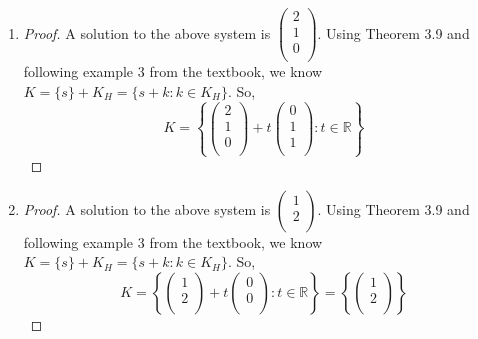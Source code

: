 \documentclass[11pt]{scrartcl}
\begin{document}
\begin{enumerate}[label=\alph*.]
{\begin{proof}
\[				t\begin{pmatrix}
					1\\
					2\\
					3\\
				\end{pmatrix}: t \in \mathbb{R}
			\right\}
			\]
		\end{proof}
	}
	\item{
		\begin{proof}
			A solution to the above system is  
			$
			\begin{pmatrix}
				2\\
				1\\
				0\\
			\end{pmatrix}
			$.	
			Using Theorem 3.9 and following example 3 from the textbook, we know $K = \{s\} + K_H = \{s + k : k \in K_H \}$.
			So, 
			\[
			K=
			\left\{
				\begin{pmatrix}
					2\\
					1\\
					0\\
				\end{pmatrix} +
				t\begin{pmatrix}
					0\\
					1\\
					1\\
				\end{pmatrix}: t \in \mathbb{R}
			\right\}
			\]
		\end{proof}
	}
	\item{
		\begin{proof}
			A solution to the above system is  
			$
			\begin{pmatrix}
				1\\
				2\\
			\end{pmatrix}
			$.	
			Using Theorem 3.9 and following example 3 from the textbook, we know $K = \{s\} + K_H = \{s + k : k \in K_H \}$.
			So, 
			\[
			K=
			\left\{
				\begin{pmatrix}
					1\\
					2\\
				\end{pmatrix} +
				t\begin{pmatrix}
					0\\
					0\\
				\end{pmatrix}: t \in \mathbb{R}
			\right\} = 
			\left\{
				\begin{pmatrix}
					1\\
					2\\
				\end{pmatrix} 
			\right\}
			\]
		\end{proof}	
	}
\end{enumerate}
\end{document}
